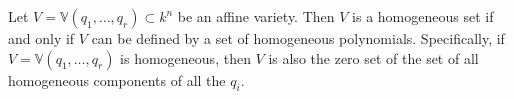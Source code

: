 Let $V = \mathbb{V}(q_1, \ldots, q_r) \subset k^n$ be an affine variety. Then $V$ is a homogeneous set if and only if $V$ can be defined by a set of homogeneous polynomials. Specifically, if $V = \mathbb{V}(q_1, \ldots, q_r)$ is homogeneous, then $V$ is also the zero set of the set of all homogeneous components of all the $q_i$.
